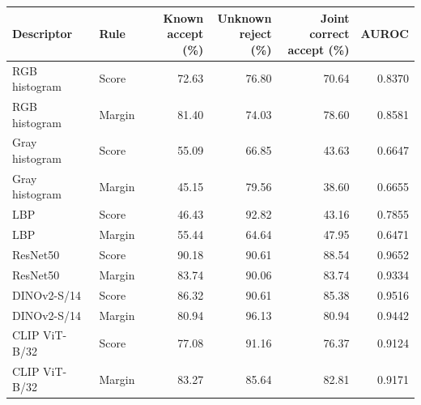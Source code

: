 \begin{tabular}{llrrrr}
\toprule
Descriptor & Rule & \makecell{Known\\accept (\%)} & \makecell{Unknown\\reject (\%)} & \makecell{Joint correct\\accept (\%)} & AUROC \\
\midrule
RGB histogram & Score & 72.63 & 76.80 & 70.64 & 0.8370 \\
RGB histogram & Margin & 81.40 & 74.03 & 78.60 & 0.8581 \\
Gray histogram & Score & 55.09 & 66.85 & 43.63 & 0.6647 \\
Gray histogram & Margin & 45.15 & 79.56 & 38.60 & 0.6655 \\
LBP & Score & 46.43 & 92.82 & 43.16 & 0.7855 \\
LBP & Margin & 55.44 & 64.64 & 47.95 & 0.6471 \\
ResNet50 & Score & 90.18 & 90.61 & 88.54 & 0.9652 \\
ResNet50 & Margin & 83.74 & 90.06 & 83.74 & 0.9334 \\
DINOv2-S/14 & Score & 86.32 & 90.61 & 85.38 & 0.9516 \\
DINOv2-S/14 & Margin & 80.94 & 96.13 & 80.94 & 0.9442 \\
CLIP ViT-B/32 & Score & 77.08 & 91.16 & 76.37 & 0.9124 \\
CLIP ViT-B/32 & Margin & 83.27 & 85.64 & 82.81 & 0.9171 \\
\bottomrule
\end{tabular}

